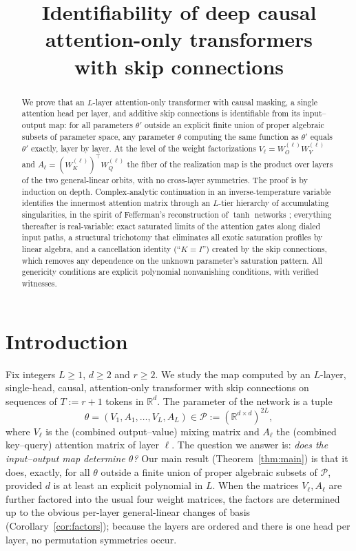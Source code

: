 \documentclass[11pt]{article}
\title{Identifiability of deep causal attention-only transformers\\ with skip connections}
\author{}
\date{}
\theoremstyle{definition}
\theoremstyle{remark}
\theoremstyle{plain}
\newcommand{\R}{\mathbb{R}}
\newcommand{\cP}{\mathcal{P}}
\begin{document}
\maketitle

\begin{abstract}
We prove that an $L$-layer attention-only transformer with causal masking, a single
attention head per layer, and additive skip connections is identifiable from its
input--output map: for all parameters $\theta'$ outside an explicit finite union of proper
algebraic subsets of parameter space, any parameter $\theta$ computing the same function as
$\theta'$ equals $\theta'$ exactly, layer by layer.  At the level of the weight
factorizations $V_\ell=W_O^{(\ell)}W_V^{(\ell)}$ and
$A_\ell=(W_K^{(\ell)})^{\top}W_Q^{(\ell)}$ the fiber of the realization map is the product
over layers of the two general-linear orbits, with no cross-layer symmetries.  The proof is
by induction on depth.  Complex-analytic continuation in an inverse-temperature variable
identifies the innermost attention matrix through an $L$-tier hierarchy of accumulating
singularities, in the spirit of Fefferman's reconstruction of $\tanh$ networks
\cite{fefferman1994reconstructing}; everything thereafter is real-variable: exact saturated
limits of the attention gates along dialed input paths, a structural trichotomy that
eliminates all exotic saturation profiles by linear algebra, and a cancellation identity
(``$K=I$'') created by the skip connections, which removes any dependence on the unknown
parameter's saturation pattern.  All genericity conditions are explicit polynomial
nonvanishing conditions, with verified witnesses.
\end{abstract}

\section{Introduction}\label{sec:intro}

Fix integers $L\ge 1$, $d\ge 2$ and $r\ge 2$.  We study the map computed by an $L$-layer,
single-head, causal, attention-only transformer with skip connections on sequences of
$T:=r+1$ tokens in $\R^d$.  The parameter of the network is a tuple
\[
\theta=(V_1,A_1,\dots,V_L,A_L)\in\cP:=(\R^{d\times d})^{2L},
\]
where $V_\ell$ is the (combined output--value) mixing matrix and $A_\ell$ the (combined
key--query) attention matrix of layer $\ell$.  The question we answer is: \emph{does the
input--output map determine $\theta$?}  Our main result
(Theorem~\ref{thm:main}) is that it does, exactly, for all $\theta$ outside a finite union
of proper algebraic subsets of $\cP$, provided $d$ is at least an explicit polynomial in
$L$.  When the matrices $V_\ell,A_\ell$ are further factored into the usual four weight
matrices, the factors are determined up to the obvious per-layer general-linear changes of
basis (Corollary~\ref{cor:factors}); because the layers are ordered and there is one head
per layer, no permutation symmetries occur.
\end{document}

